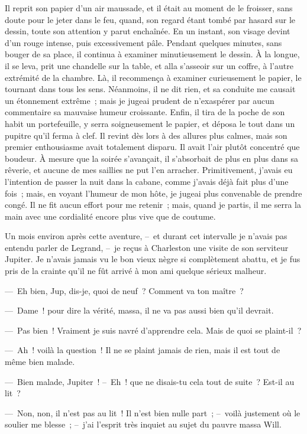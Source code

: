 \documentclass[french,twoside]{book} %
\begin{document}
Il reprit son papier d’un air maussade, et il était au moment de le froisser, sans doute pour le jeter dans le feu, quand, son regard étant tombé par hasard sur le dessin, toute son attention y parut enchaînée. En un instant, son visage devint d’un rouge intense, puis excessivement pâle. Pendant quelques minutes, sans bouger de sa place, il continua à examiner minutieusement le dessin. À la longue, il se leva, prit une chandelle sur la table, et alla s’asseoir sur un coffre, à l’autre extrémité de la chambre. Là, il recommença à examiner curieusement le papier, le tournant dans tous les sens. Néanmoins, il ne dit rien, et sa conduite me causait un étonnement extrême ; mais je jugeai prudent de n’exaspérer par aucun commentaire sa mauvaise humeur croissante. Enfin, il tira de la poche de son habit un portefeuille, y serra soigneusement le papier, et déposa le tout dans un pupitre qu’il ferma à clef. Il revint dès lors à des allures plus calmes, mais son premier enthousiasme avait totalement disparu. Il avait l’air plutôt concentré que boudeur. À mesure que la soirée s’avançait, il s’absorbait de plus en plus dans sa rêverie, et aucune de mes saillies ne put l’en arracher. Primitivement, j’avais eu l’intention de passer la nuit dans la cabane, comme j’avais déjà fait plus d’une fois ; mais, en voyant l’humeur de mon hôte, je jugeai plus convenable de prendre congé. Il ne fit aucun effort pour me retenir ; mais, quand je partis, il me serra la main avec une cordialité encore plus vive que de coutume.\par
Un mois environ après cette aventure, – et durant cet intervalle je n’avais pas entendu parler de Legrand, – je reçus à Charleston une visite de son serviteur Jupiter. Je n’avais jamais vu le bon vieux nègre si complètement abattu, et je fus pris de la crainte qu’il ne fût arrivé à mon ami quelque sérieux malheur.\par
— Eh bien, Jup, dis-je, quoi de neuf ? Comment va ton maître ?\par
— Dame ! pour dire la vérité, massa, il ne va pas aussi bien qu’il devrait.\par
— Pas bien ! Vraiment je suis navré d’apprendre cela. Mais de quoi se plaint-il ?\par
— Ah ! voilà la question ! Il ne se plaint jamais de rien, mais il est tout de même bien malade.\par
— Bien malade, Jupiter ! – Eh ! que ne disais-tu cela tout de suite ? Est-il au lit ?\par
— Non, non, il n’est pas au lit ! Il n’est bien nulle part ; – voilà justement où le soulier me blesse ; – j’ai l’esprit très inquiet au sujet du pauvre massa Will.\par
\end{document}
